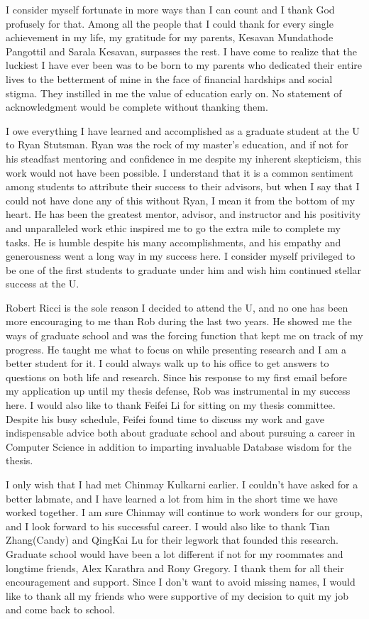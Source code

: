 I consider myself fortunate in more ways than I can count and I thank God profusely for that. 
Among all the people that I could thank for every single achievement in my life, my gratitude for my parents, Kesavan Mundathode Pangottil and Sarala Kesavan, surpasses the rest. 
I have come to realize that the luckiest I have ever been was to be born to my parents who dedicated their entire lives to the betterment of mine in the face of financial hardships and social stigma. 
They instilled in me the value of education early on. No statement of acknowledgment would be complete without thanking them.

I owe everything I have learned and accomplished as a graduate student at the U to Ryan Stutsman. 
Ryan was the rock of my master's education, and if not for his steadfast mentoring and confidence in me despite my inherent skepticism, this work would not have been possible. I understand that it is a common sentiment among students to attribute their success to their advisors, but when I say that I could not have done any of this without Ryan, I mean it from the bottom of my heart. 
He has been the greatest mentor, advisor, and instructor and his positivity and unparalleled work ethic inspired me to go the extra mile to complete my tasks. 
He is humble despite his many accomplishments, and his empathy and generousness went a long way in my success here. 
I consider myself privileged to be one of the first students to graduate under him and wish him continued stellar success at the U.

Robert Ricci is the sole reason I decided to attend the U, and no one has been more encouraging to me than Rob during the last two years. 
He showed me the ways of graduate school and was the forcing function that kept me on track of my progress. 
He taught me what to focus on while presenting research and I am a better student for it. 
I could always walk up to his office to get answers to questions on both life and research. 
Since his response to my first email before my application up until my thesis defense, Rob was instrumental in my success here. 
I would also like to thank Feifei Li for sitting on my thesis committee. Despite his busy schedule, Feifei found time to discuss my work and gave indispensable advice both about graduate school and about pursuing a career in Computer Science in addition to imparting invaluable Database wisdom for the thesis.

I only wish that I had met Chinmay Kulkarni earlier. 
I couldn't have asked for a better labmate, and I have learned a lot from him in the short time we have worked together. 
I am sure Chinmay will continue to work wonders for our group, and I look forward to his successful career. 
I would also like to thank Tian Zhang(Candy) and QingKai Lu for their legwork that founded this research. 
Graduate school would have been a lot different if not for my roommates and longtime friends, Alex Karathra and Rony Gregory. 
I thank them for all their encouragement and support. Since I don't want to avoid missing names, I would like to thank all my friends who were supportive of my decision to quit my job and come back to school.

